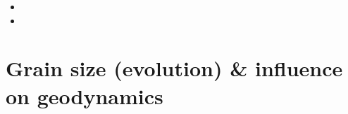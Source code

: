\begin{small}
\begin{itemize}
\item[\twothousandfifteen]
\item[\twothousandnineteen]
\end{itemize}
\end{small}

\section{Grain size (evolution) \& influence on geodynamics}
\label{sec:topics:gsev}

